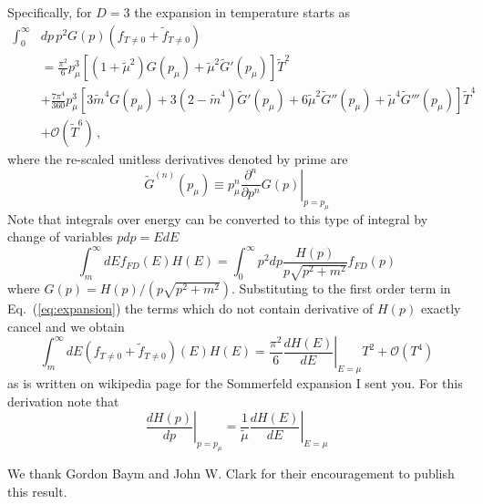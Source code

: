 \documentclass[sn-mathphys,Numbered]{sn-jnl}
\newcommand{\wt}[1]{\widetilde{#1}}
\newcommand{\req}[1]{Eq.~(\ref{#1})}
\begin{document}
Specifically, for $D=3$ the expansion in temperature starts as
\begin{equation}\label{eq:expansion}
    \begin{split}
    \int_0^\infty &dp\, p^2 G(p) (f_{T\neq 0} + \widetilde{f}_{T\neq 0})\\
    &= \frac{\pi^2}{6} p_\mu^3\left[(1 + \wt{\mu}^2)G(p_{\mu}) + \wt{\mu}^2  \wt{G}'(p_{\mu})\right] \wt{T}^2 \\
    &+ \frac{7\pi^4}{360}p_\mu^3\left[3\wt{m}^4 G(p_{\mu}) + 3(2-\wt{m}^4)\wt{G}'(p_{\mu})+ 6\wt{\mu}^2 \wt{G}''(p_{\mu}) + \wt{\mu}^4 \wt{G}'''(p_{\mu})\right]\wt{T}^4\\
    &+ \mathcal{O}(\wt{T}^6)\,,
    \end{split}
\end{equation}
where the re-scaled unitless derivatives denoted by prime are 
\begin{equation}
    \wt{G}^{(n)}(p_\mu) \equiv p_\mu^n \left.\frac{\partial^{n}}{\partial p^{n}} G(p)\right|_{p = p_\mu}
\end{equation}
Note that integrals over energy can be converted to this type of integral by change of variables $p dp = E dE$
\begin{equation}
    \int_m^\infty dE f_{FD}(E) H(E) = \int_0^\infty p^2 dp \frac{H(p)}{p\sqrt{p^2 + m^2}}f_{FD}(p) 
\end{equation}
where $G(p) = H(p)/(p\sqrt{p^2+m^2})$. Substituting to the first order term in \req{eq:expansion} the terms which do not contain derivative of $H(p)$ exactly cancel and we obtain
\begin{equation}
    \int_m^\infty dE (f_{T\neq 0}+\widetilde{f}_{T\neq 0})(E)H(E) = \frac{\pi^2}{6} \left.\frac{dH(E)}{dE}\right|_{E=\mu} T^2 + \mathcal{O}(T^4)
\end{equation}
as is written on wikipedia page for the Sommerfeld expansion I sent you. For this derivation note that
\begin{equation}
    \left. \frac{dH(p)}{dp}\right|_{p=p_\mu} = \left.\frac{1}{\wt{\mu}}\frac{dH(E)}{dE}\right|_{E=\mu}
\end{equation}

\backmatter

We thank Gordon Baym and John W. Clark for their encouragement to publish this result.


\end{document}
